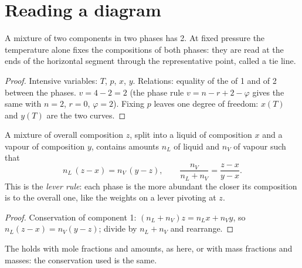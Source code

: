 \section{Reading a diagram}

\begin{proposition}\label{prop:b2:liquid-vapour-diagrams:variance}
A mixture of two components in two phases has  2. At fixed pressure
the temperature alone fixes the compositions of both phases: they are read
at the ends of the horizontal segment through the representative point,
called a tie line.
\end{proposition}

\begin{proof}
Intensive variables: $T$, $p$, $x$, $y$. Relations: equality of the  of 1 and of 2 between the phases. $v = 4 - 2 = 2$ (the phase rule
$v = n - r + 2 - \varphi$ gives the same with $n = 2$, $r = 0$, $\varphi = 2$).
Fixing $p$ leaves one degree of freedom: $x(T)$ and $y(T)$ are the two curves.
\end{proof}

\begin{theorem}\label{thm:b2:liquid-vapour-diagrams:lever}
A mixture of overall composition $z$, split into a liquid of composition $x$
and a vapour of composition $y$, contains amounts $n_L$ of liquid and $n_V$ of
vapour such that
\[
  n_L\,(z - x) = n_V\,(y - z), \qquad \frac{n_V}{n_L + n_V} = \frac{z - x}{y - x} .
\]
This is the \emph{lever rule}: each phase is the more
abundant the closer its composition is to the overall one, like the weights on
a lever pivoting at $z$.
\end{theorem}

\begin{proof}
Conservation of component 1: $(n_L + n_V)z = n_Lx + n_Vy$, so $n_L(z - x) =
n_V(y - z)$; divide by $n_L + n_V$ and rearrange.
\end{proof}

The  holds with mole fractions and amounts, as here, or with mass
fractions and masses: the conservation used is the same.

